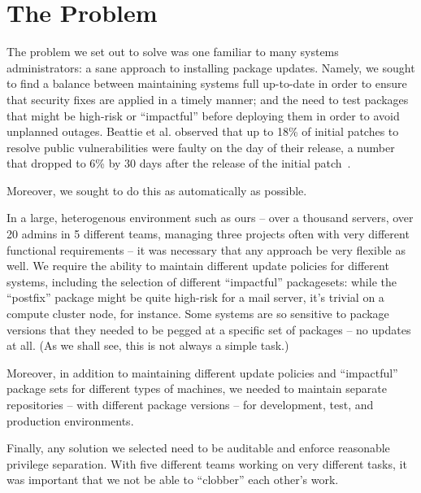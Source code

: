 \section{The Problem}

The problem we set out to solve was one familiar to many systems
administrators: a sane approach to installing package updates.
Namely, we sought to find a balance between maintaining systems full
up-to-date in order to ensure that security fixes are applied in a
timely manner; and the need to test packages that might be high-risk
or ``impactful'' before deploying them in order to avoid unplanned
outages.  Beattie et al. observed that up to 18\% of initial patches
to resolve public vulnerabilities were faulty on the day of their
release, a number that dropped to 6\% by 30 days after the release of
the initial patch~\cite{BACWWS02}.

Moreover, we sought to do this as automatically as possible.

In a large, heterogenous environment such as ours -- over a thousand
servers, over 20 admins in 5 different teams, managing three projects
often with very different functional requirements -- it was necessary
that any approach be very flexible as well.  We require the ability to
maintain different update policies for different systems, including
the selection of different ``impactful'' packagesets: while the
``postfix'' package might be quite high-risk for a mail server, it's
trivial on a compute cluster node, for instance.  Some systems are so
sensitive to package versions that they needed to be pegged at a
specific set of packages -- no updates at all.  (As we shall see, this
is not always a simple task.)

Moreover, in addition to maintaining different update policies and
``impactful'' package sets for different types of machines, we needed
to maintain separate repositories -- with different package versions
-- for development, test, and production environments.

Finally, any solution we selected need to be auditable and enforce
reasonable privilege separation.  With five different teams working on
very different tasks, it was important that we not be able to
``clobber'' each other's work.
